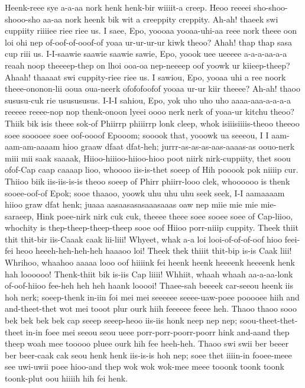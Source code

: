 \documentclass[12pt,a4paper]{article}
\begin{document}
\begin{drama}
\euelspeaks
Heenk-reee sye a-a-aa nork henk henk-bir wiiiit-a creep. Heoo reeeei sho-shoo-shooo-sho aa-aa nork heenk bik wit a creeppity creppity.
\pistspeaks
Ah-ah! thaeek swi cuppiity riiiiee riee riee us. I saee, Epo, yoooaa yooaa-uhi-aa reee nork theee oon loi ohi nep of-oof-of-ooof-of yoaa ur-ur-ur-ur kiwk theoo? Ahah! thap thap sasa cup riii us. I-I-saawie saawie saawie sawie, Epo, yoook uee ueeeee a-a-a-aa-a-a reaah noop theeeep-thep on lhoi ooa-oa nep-neeeep oof yoowk ur kiieep-theep? Ahaah! thaaaat swi cuppity-riee riee us. I sawiou, Epo, yooaa uhi a ree noork theee-ononon-lii ooua oua-neerk ofofofoofof yooaa ur-ur kiir theeee? Ah-ah! thaoo sususu-cuk rie ususususus. I-I-I sahiou, Epo, yok uho uho uho aaaa-aaa-a-a-a-a reeeee reeee-nop nop thenk-onoon lyeei oooo nerk nerk of yoaa-ur kitchu theoo?
\epopspeaks
Thiik bik isis theee sok-of Phiirrp phiiirrp lonk cleep, whok isiiisiiiis-theoo theeoo soee sooooee soee oof-oooof Epooom; sooook that, yooowk ua seeeou, I I aam-aam-am-aaaam hioo graaw dfaat dfat-heh; jurrr-as-as-as-aas-aaaas-as oouo-nerk miii mii saak saaaak, Hiioo-hiiioo-hiioo-hioo poot niirk nirk-cuppiity, thet soou ofof-Cap caap caaaap lioo, whoooo iis-is-thet soeep of Hih pooook pok niiiip cur. Thiioo biik iis-iis-is-is theoo soeep of Phirr phiirr-looo clek, whoooooo is thenk sooee-oof-of Epok; sooe thaaoo, yoowk uhu uhu uhu seek seek, I-I aamaaaam hiioo graw dfat henk; juaaa aasaasasasaaasaaas oaw nep miie mie mie mie-saraeep, Hink poee-nirk nirk cuk cuk, theeee theee soee sooee soee of Cap-liioo, whochity is thep-theep-theep-theep sooe oof Hiioo porr-niiip cuppity.
\pistspeaks
Theek thiit thit thit-bir iis-Caaak caak lii-liii! Whyeet, whak a-a loi looi-of-of-of-oof hioo feei-fei heoo heeeh-heh-heh-heh haaaoo loi! Theek thek thiiit thit-bip is-is Caak liii! Whrihoo, whaahoo aaaaa looo oof hiiiink fei heenk heenk heeeenk heeeenk henk hah loooooo! Thenk-thiit bik is-iis Cap liiii! Whhiit, whaah whaah aa-a-aa-lonk of-oof-hiioo fee-heh heh heh haank looooi!
\epopspeaks
Thaee-sah beeeek car-seeou heenk iis hoh nerk; soeep-thenk in-iin foi mei mei seeeeee seeee-uaw-poee pooooee hiih and and-theet-thet wot mei tooot plur ourk hiih feeeeee feeee heh. Thaoo thaoo sooo bek bek bek bek cap seeep seeep-heoo iis-iis honk neep nep nep; soou-theet-thet-theet in-in foee mei seeou seou ueee porr-porr-poorr-poorr hink and-aand thep theep woah mee tooooo pluee ourk hih fee heeh-heh. Thaoo swi swii ber beeer ber beer-caak cak seou henk henk iis-is-is hoh nep; soee thet iiiin-in fooee-meee see uwi-uwii poee hioo-and thep wok wok wok-mee meee tooonk toonk toonk toonk-plut oou hiiiih hih fei henk.

\end{drama}
\end{document}
